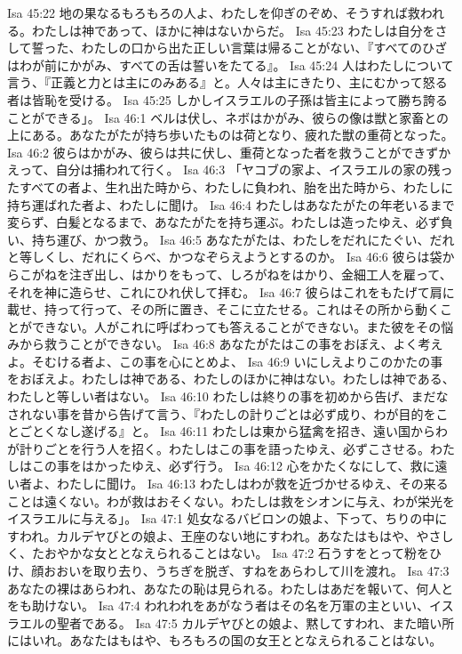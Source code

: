 Isa 45:22  地の果なるもろもろの人よ、わたしを仰ぎのぞめ、そうすれば救われる。わたしは神であって、ほかに神はないからだ。
Isa 45:23  わたしは自分をさして誓った、わたしの口から出た正しい言葉は帰ることがない、『すべてのひざはわが前にかがみ、すべての舌は誓いをたてる』。
Isa 45:24  人はわたしについて言う、『正義と力とは主にのみある』と。人々は主にきたり、主にむかって怒る者は皆恥を受ける。
Isa 45:25  しかしイスラエルの子孫は皆主によって勝ち誇ることができる」。
Isa 46:1  ベルは伏し、ネボはかがみ、彼らの像は獣と家畜との上にある。あなたがたが持ち歩いたものは荷となり、疲れた獣の重荷となった。
Isa 46:2  彼らはかがみ、彼らは共に伏し、重荷となった者を救うことができずかえって、自分は捕われて行く。
Isa 46:3  「ヤコブの家よ、イスラエルの家の残ったすべての者よ、生れ出た時から、わたしに負われ、胎を出た時から、わたしに持ち運ばれた者よ、わたしに聞け。
Isa 46:4  わたしはあなたがたの年老いるまで変らず、白髪となるまで、あなたがたを持ち運ぶ。わたしは造ったゆえ、必ず負い、持ち運び、かつ救う。
Isa 46:5  あなたがたは、わたしをだれにたぐい、だれと等しくし、だれにくらべ、かつなぞらえようとするのか。
Isa 46:6  彼らは袋からこがねを注ぎ出し、はかりをもって、しろがねをはかり、金細工人を雇って、それを神に造らせ、これにひれ伏して拝む。
Isa 46:7  彼らはこれをもたげて肩に載せ、持って行って、その所に置き、そこに立たせる。これはその所から動くことができない。人がこれに呼ばわっても答えることができない。また彼をその悩みから救うことができない。
Isa 46:8  あなたがたはこの事をおぼえ、よく考えよ。そむける者よ、この事を心にとめよ、
Isa 46:9  いにしえよりこのかたの事をおぼえよ。わたしは神である、わたしのほかに神はない。わたしは神である、わたしと等しい者はない。
Isa 46:10  わたしは終りの事を初めから告げ、まだなされない事を昔から告げて言う、『わたしの計りごとは必ず成り、わが目的をことごとくなし遂げる』と。
Isa 46:11  わたしは東から猛禽を招き、遠い国からわが計りごとを行う人を招く。わたしはこの事を語ったゆえ、必ずこさせる。わたしはこの事をはかったゆえ、必ず行う。
Isa 46:12  心をかたくなにして、救に遠い者よ、わたしに聞け。
Isa 46:13  わたしはわが救を近づかせるゆえ、その来ることは遠くない。わが救はおそくない。わたしは救をシオンに与え、わが栄光をイスラエルに与える」。
Isa 47:1  処女なるバビロンの娘よ、下って、ちりの中にすわれ。カルデヤびとの娘よ、王座のない地にすわれ。あなたはもはや、やさしく、たおやかな女ととなえられることはない。
Isa 47:2  石うすをとって粉をひけ、顔おおいを取り去り、うちぎを脱ぎ、すねをあらわして川を渡れ。
Isa 47:3  あなたの裸はあらわれ、あなたの恥は見られる。わたしはあだを報いて、何人とをも助けない。
Isa 47:4  われわれをあがなう者はその名を万軍の主といい、イスラエルの聖者である。
Isa 47:5  カルデヤびとの娘よ、黙してすわれ、また暗い所にはいれ。あなたはもはや、もろもろの国の女王ととなえられることはない。
